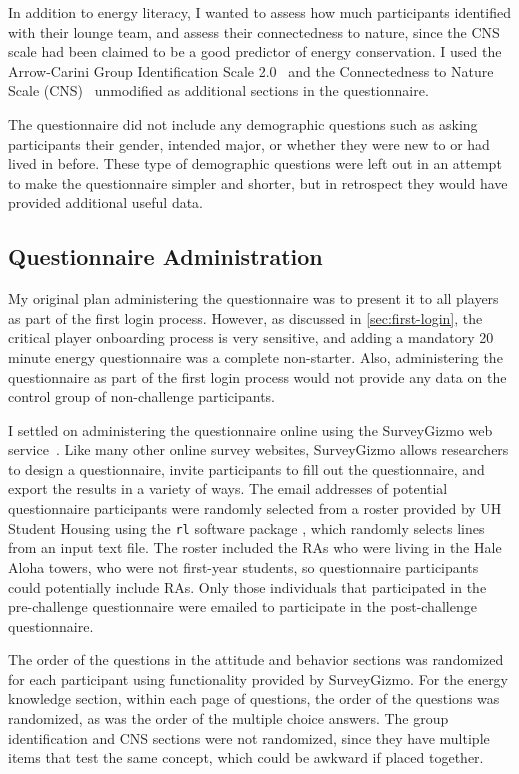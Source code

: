 In addition to energy literacy, I wanted to assess how much participants identified with their lounge team, and assess their connectedness to nature, since the CNS scale had been claimed to be a good predictor of energy conservation. I used the Arrow-Carini Group Identification Scale 2.0~\cite{Henry1999} and the Connectedness to Nature Scale (CNS)~\cite{MayerFrantz2004} unmodified as additional sections in the questionnaire.

The questionnaire did not include any demographic questions such as asking participants their gender, intended major, or whether they were new to \Hawaii or had lived in \Hawaii before. These type of demographic questions were left out in an attempt to make the questionnaire simpler and shorter, but in retrospect they would have provided additional useful data.


\subsection{Questionnaire Administration}

My original plan administering the questionnaire was to present it to all players as part of the first login process. However, as discussed in \autoref{sec:first-login}, the critical player onboarding process is very sensitive, and adding a mandatory 20 minute energy questionnaire was a complete non-starter. Also, administering the questionnaire as part of the first login process would not provide any data on the control group of non-challenge participants.

I settled on administering the questionnaire online using the SurveyGizmo web service~\cite{surveygizmo}. Like many other online survey websites, SurveyGizmo allows researchers to design a questionnaire, invite participants to fill out the questionnaire, and export the results in a variety of ways. The email addresses of potential questionnaire participants were randomly selected from a roster provided by UH \Manoa Student Housing using the \texttt{rl} software package \cite{rl-website}, which randomly selects lines from an input text file. The roster included the RAs who were living in the Hale Aloha towers, who were not first-year students, so questionnaire participants could potentially include RAs. Only those individuals that participated in the pre-challenge questionnaire were emailed to participate in the post-challenge questionnaire. 

The order of the questions in the attitude and behavior sections was randomized for each participant using functionality provided by SurveyGizmo. For the energy knowledge section, within each page of questions, the order of the questions was randomized, as was the order of the multiple choice answers. The group identification and CNS sections were not randomized, since they have multiple items that test the same concept, which could be awkward if placed together.

